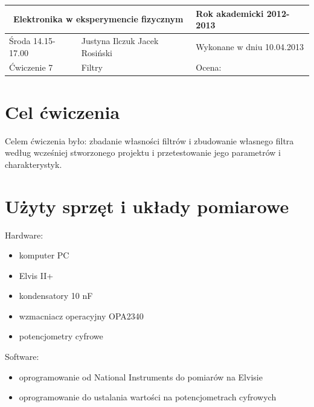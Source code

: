 \documentclass[a4paper,11pt]{article}
\author{Justyna Ilczuk, Jacek Rosiński}
\begin{document}
\begin{center}

    \begin{tabular}{ | m{5cm}| m{5cm} | m{5cm} |}
    \hline 
    \multicolumn{2}{|c|}{Elektronika w eksperymencie fizycznym}
    & Rok akademicki 2012-2013 \\ 
    
    \hline
    Środa 14.15-17.00 
    & Justyna Ilczuk \newline Jacek Rosiński
    & Wykonane w dniu 10.04.2013 \\
   	
   	\hline
   	Ćwiczenie 7 & Filtry &    Ocena: \\
   	\hline
    \end{tabular}
\end{center}

\pagestyle{fancy}
\fancyfoot[CO]{\ }
\fancyhead[RO]{\footnotesize{\thepage} }




\section{Cel ćwiczenia}
Celem ćwiczenia było:
zbadanie własności filtrów i zbudowanie własnego filtra według wcześniej stworzonego projektu i przetestowanie jego parametrów i charakterystyk.

\section{Użyty sprzęt i układy pomiarowe}

Hardware:
\begin{itemize}
\item komputer PC
\item Elvis II+
\item kondensatory 10 nF
\item wzmacniacz operacyjny OPA2340
\item potencjometry cyfrowe
\end{itemize}

Software:
\begin{itemize}
\item oprogramowanie od National Instruments do pomiarów na Elvisie
\item oprogramowanie do ustalania wartości na potencjometrach cyfrowych
\end{itemize}
\end{document}
